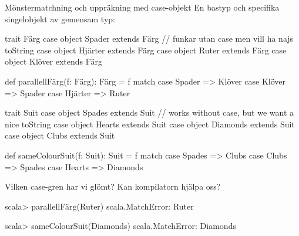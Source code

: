\begin{Slide}{Mönstermatchning och uppräkning med case-objekt}\SlideFontSmall
En bastyp och specifika singelobjekt av gemensam typ:
\ifswedish
\begin{Code}
trait Färg
case object Spader  extends Färg // funkar utan case men vill ha najs toString
case object Hjärter extends Färg
case object Ruter   extends Färg
case object Klöver  extends Färg

def parallellFärg(f: Färg): Färg = f match
  case Spader  => Klöver
  case Klöver  => Spader
  case Hjärter => Ruter
\end{Code}
\else
\begin{Code}
trait Suit
case object Spades  extends Suit // works without case, but we want a nice toString
case object Hearts extends Suit
case object Diamonds   extends Suit
case object Clubs  extends Suit

def sameColourSuit(f: Suit): Suit = f match
  case Spades  => Clubs
  case Clubs  => Spades
  case Hearts => Diamonds
\end{Code}
\fi{}
Vilken case-gren har vi glömt? Kan kompilatorn hjälpa oss?
\pause
\ifswedish
\begin{REPL}
scala> parallellFärg(Ruter)
scala.MatchError: Ruter 
\end{REPL}
\else
\begin{REPL}
scala> sameColourSuit(Diamonds)
scala.MatchError: Diamonds 
\end{REPL}
\fi{}
 \code{:(}
\end{Slide}

